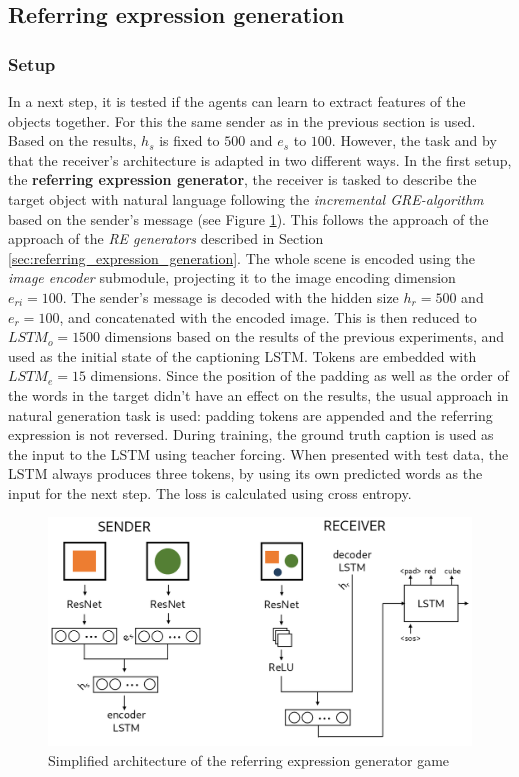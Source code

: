 \subsection{Referring expression generation}
\label{sec:referring-expression-generation-game}
\subsubsection*{Setup}

In a next step, it is tested if the agents can learn to extract features of the objects together.
For this the same sender as in the previous section is used.
Based on the results, $h_s$ is fixed to $500$ and $e_s$ to $100$.
However, the task and by that the receiver's architecture is adapted in two different ways.
In the first setup, the \textbf{referring expression generator}, the receiver is tasked to describe the target object with natural language following the \emph{incremental GRE-algorithm} based on the sender's message (see Figure \ref{fig:caption_generator_game_architecture}).
This follows the approach of the approach of the \emph{RE generators} described in Section \ref{sec:referring_expression_generation}.
The whole scene is encoded using the \emph{image encoder} submodule, projecting it to the image encoding dimension $e_{ri}=100$.
The sender's message is decoded with the hidden size $h_r=500$ and $e_r=100$, and concatenated with the encoded image.
This is then reduced to $LSTM_o=1500$ dimensions based on the results of the previous experiments, and used as the initial state of the captioning LSTM.
Tokens are embedded with $LSTM_e=15$ dimensions.
Since the position of the padding as well as the order of the words in the target didn't have an effect on the results, the usual approach in natural generation task is used: padding tokens are appended and the referring expression is not reversed.
During training, the ground truth caption is used as the input to the LSTM using teacher forcing.
When presented with test data, the LSTM always produces three tokens, by using its own predicted words as the input for the next step.
The loss is calculated using cross entropy.

\begin{figure}[ht]
    \centering
    \includegraphics[width=.7\linewidth]{figures/arch_caption_generator_game.png}
    \caption{Simplified architecture of the referring expression generator game}
    \label{fig:caption_generator_game_architecture}
\end{figure}

